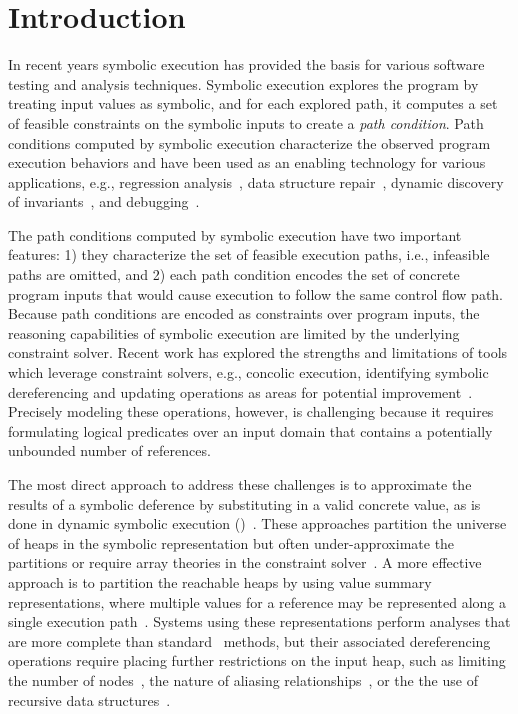\section{Introduction}

In recent years symbolic execution has provided the basis for various
software testing and analysis techniques. Symbolic execution explores
the program by treating input values as symbolic, and for each
explored path, it computes a set of feasible constraints on the
symbolic inputs to create a \emph{path condition}. Path conditions
computed by symbolic execution characterize the observed program
execution behaviors and have been used as an enabling technology for
various applications, e.g., regression
analysis~\cite{backes:2012,Godefroid:SAS11,Person:FSE08,person:pldi2011,Ramos:2011,Yang:ISSTA12},
data structure repair~\cite{KhurshidETAL05RepairingStructurally},
dynamic discovery of
invariants~\cite{CsallnerETAL08DySy,Zhang:ISSTA14}, and
debugging~\cite{Ma:2011}.

The path conditions computed by symbolic execution have two important
features: 1) they characterize the set of feasible execution paths,
i.e., infeasible paths are omitted, and 2) each path condition encodes
the set of concrete program inputs that would cause execution to
follow the same control flow path. Because path conditions are encoded
as constraints over program inputs, the reasoning capabilities of
symbolic execution are limited by the underlying constraint
solver. Recent work has explored the strengths and limitations of
tools which leverage constraint solvers, e.g., concolic execution,
identifying symbolic dereferencing and updating operations as areas
for potential improvement~\cite{Chen:2013,Qu:2011}.  Precisely
modeling these operations, however, is challenging because it requires
formulating logical predicates over an input domain that contains a
potentially unbounded number of references.

The most direct approach to address these challenges is to approximate
the results of a symbolic deference by substituting in a valid
concrete value, as is done in dynamic symbolic execution
(\dsetxt{})~\cite{Godefroid:POPL07,Godefroid:2005,Sen:2005,Tillmann:2008}. These
approaches partition the universe of heaps in the symbolic
representation but often under-approximate the partitions or require
array theories in the constraint
solver~\cite{Chen:2013,Elkarablieh:2009}. A more effective approach is
to partition the reachable heaps by using value summary
representations, where multiple values for a reference may be
represented along a single execution
path~\cite{Dillig:2011,Elkarablieh:2009,Sen:2014,Torlak:2014,Xie:2005,Yorsh:2008}. Systems
using these representations perform analyses that are more complete
than standard~\dsetxt{} methods, but their associated dereferencing
operations require placing further restrictions on the input heap,
such as limiting the number of nodes~\cite{Elkarablieh:2009}, the
nature of aliasing relationships~\cite{Babic:2007,Xie:2005}, or the
the use of recursive data structures~\cite{Dillig:2011}.


